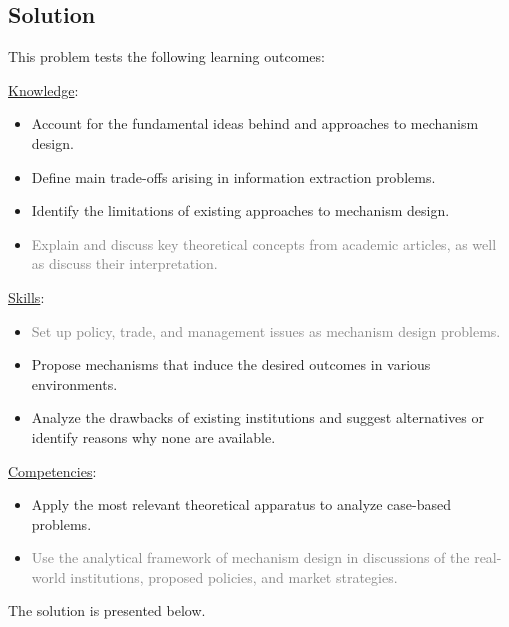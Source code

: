 \documentclass[a4paper]{article}
\begin{document}
\subsection*{Solution}
This problem tests the following learning outcomes:
\begin{framed}
	\underline{Knowledge}:
	\begin{itemize}[$\circ$]
		\item {Account for the fundamental ideas behind and approaches to mechanism design.}
		\item {Define main trade-offs arising in information extraction problems.}
		\item {Identify the limitations of existing approaches to mechanism design.}
		\item \textcolor{gray}{Explain and discuss key theoretical concepts from academic articles, as well as discuss their interpretation.}
	\end{itemize}
	\underline{Skills}:
	\begin{itemize}[$\circ$]
		\item \textcolor{gray}{Set up policy, trade, and management issues as mechanism design problems.}
		\item {Propose mechanisms that induce the desired outcomes in various environments.}
		\item {Analyze the drawbacks of existing institutions and suggest alternatives or identify reasons why none are available.}
	\end{itemize}
	\underline{Competencies}:
	\begin{itemize}[$\circ$]
		\item {Apply the most relevant theoretical apparatus to analyze case-based problems.}
		\item \textcolor{gray}{Use the analytical framework of mechanism design in discussions of the real-world institutions, proposed policies, and market strategies.}
	\end{itemize}
\end{framed}

The solution is presented below.
\end{document}
